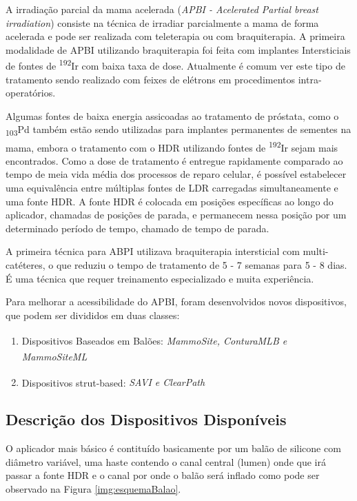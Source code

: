 \documentclass[11pt,a4paper]{article}
\begin{document}
		A irradiação parcial da mama acelerada (\textit{APBI - Acelerated Partial breast irradiation}) consiste na técnica de irradiar parcialmente a mama de forma acelerada e pode ser realizada com teleterapia ou com braquiterapia. A primeira modalidade de APBI utilizando braquiterapia foi feita com implantes Intersticiais de fontes de \textsuperscript{192}Ir com baixa taxa de dose. Atualmente é comum ver este tipo de tratamento sendo realizado com feixes de elétrons em procedimentos intra-operatórios.

		Algumas fontes de baixa energia assicoadas ao tratamento de próstata, como o \textsubscript{103}Pd também estão sendo utilizadas para implantes permanentes de sementes na mama, embora o tratamento com o HDR utilizando fontes de \textsuperscript{192}Ir sejam mais encontrados. Como a dose de tratamento é entregue rapidamente comparado ao tempo de meia vida média dos processos de reparo celular, é possível estabelecer uma equivalência entre múltiplas fontes de LDR carregadas simultaneamente e uma fonte HDR. A fonte HDR é colocada em posições específicas ao longo do aplicador, chamadas de posições de parada, e permanecem nessa posição por um determinado período de tempo, chamado de tempo de parada.

		A primeira técnica para ABPI utilizava braquiterapia intersticial com multi-catéteres, o que reduziu o tempo de tratamento de 5 - 7 semanas para 5 - 8 dias. É uma técnica que requer treinamento especializado e muita experiência.

		Para melhorar a acessibilidade do APBI, foram desenvolvidos novos dispositivos, que podem ser divididos em duas classes:

			\begin{enumerate}
				\item Dispositivos Baseados em Balões: \textit{MammoSite\textsuperscript{\textregistered}, ConturaMLB\textsuperscript{\textregistered} e MammoSiteML\textsuperscript{\textregistered}}
				\item Dispositivos strut-based: \textit{SAVI\textsuperscript{\textregistered} e ClearPath\textsuperscript{\textregistered}}
			\end{enumerate}
		
		\subsection{Descrição dos Dispositivos Disponíveis}

			O aplicador mais básico é contituído basicamente por um balão de silicone com diâmetro variável, uma haste contendo o canal central (lumen) onde que irá passar a fonte HDR e o canal por onde o balão será inflado como pode ser observado na Figura \ref{img:esquemaBalao}.
\end{document}
